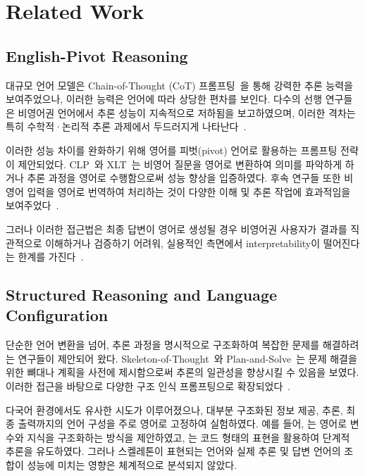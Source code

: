 \section{Related Work}
\subsection{English-Pivot Reasoning}
대규모 언어 모델은 Chain-of-Thought (CoT) 프롬프팅~\citep{cot-neurips2022}을 통해 강력한 추론 능력을 보여주었으나, 이러한 능력은 언어에 따라 상당한 편차를 보인다. 다수의 선행 연구들은 비영어권 언어에서 추론 성능이 지속적으로 저하됨을 보고하였으며, 이러한 격차는 특히 수학적·논리적 추론 과제에서 두드러지게 나타난다~\citep{shi2022language, mega-emnlp2023, wang2025polymath}.

이러한 성능 차이를 완화하기 위해 영어를 피벗(pivot) 언어로 활용하는 프롬프팅 전략이 제안되었다. CLP~\citep{clp-emnlp2023}와 XLT~\citep{xlt-emnlp2023}는 비영어 질문을 영어로 변환하여 의미를 파악하게 하거나 추론 과정을 영어로 수행함으로써 성능 향상을 입증하였다. 후속 연구들 또한 비영어 입력을 영어로 번역하여 처리하는 것이 다양한 이해 및 추론 작업에 효과적임을 보여주었다~\citep{trans-allneed-2025naacl}.

그러나 이러한 접근법은 최종 답변이 영어로 생성될 경우 비영어권 사용자가 결과를 직관적으로 이해하거나 검증하기 어려워, 실용적인 측면에서 interpretability이 떨어진다는 한계를 가진다~\citep{multilingual-prompting-emnlp2025}.

\subsection{Structured Reasoning and Language Configuration} 
단순한 언어 변환을 넘어, 추론 과정을 명시적으로 구조화하여 복잡한 문제를 해결하려는 연구들이 제안되어 왔다. Skeleton-of-Thought~\citep{ning2023skeleton}와 Plan-and-Solve~\citep{wang2023plan}는 문제 해결을 위한 뼈대나 계획을 사전에 제시함으로써 추론의 일관성을 향상시킬 수 있음을 보였다. 이러한 접근을 바탕으로 다양한 구조 인식 프롬프팅으로 확장되었다~\citep{zhou2022least,khot2022decomposed,yao2023tree}.

다국어 환경에서도 유사한 시도가 이루어졌으나, 대부분 구조화된 정보 제공, 추론, 최종 출력까지의 언어 구성을 주로 영어로 고정하여 실험하였다. 예를 들어, \citet{qi2025sot}는 영어로 변수와 지식을 구조화하는 방식을 제안하였고, \citet{li2024eliciting}는 코드 형태의 표현을 활용하여 단계적 추론을 유도하였다. 그러나 스켈레톤이 표현되는 언어와 실제 추론 및 답변 언어의 조합이 성능에 미치는 영향은 체계적으로 분석되지 않았다.

